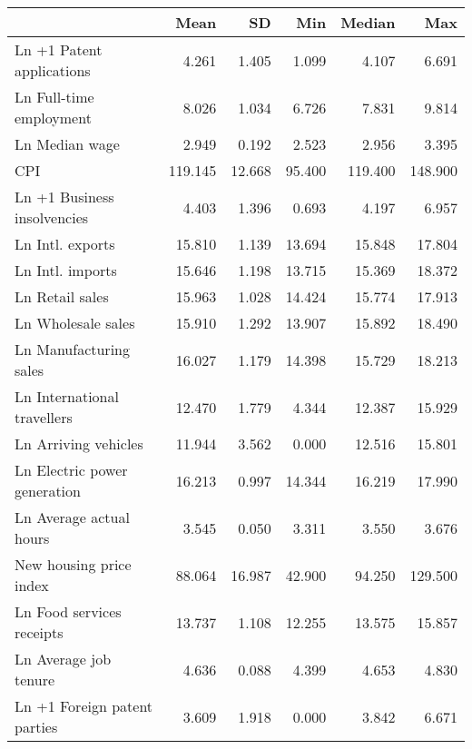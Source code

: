 
\begin{tabular}[t]{lrrrrr}
\toprule
  & Mean & SD & Min & Median & Max\\
\midrule
Ln +1 Patent applications & \num{4.261} & \num{1.405} & \num{1.099} & \num{4.107} & \num{6.691}\\
Ln Full-time employment & \num{8.026} & \num{1.034} & \num{6.726} & \num{7.831} & \num{9.814}\\
Ln Median wage & \num{2.949} & \num{0.192} & \num{2.523} & \num{2.956} & \num{3.395}\\
CPI & \num{119.145} & \num{12.668} & \num{95.400} & \num{119.400} & \num{148.900}\\
Ln +1 Business insolvencies & \num{4.403} & \num{1.396} & \num{0.693} & \num{4.197} & \num{6.957}\\
Ln Intl. exports & \num{15.810} & \num{1.139} & \num{13.694} & \num{15.848} & \num{17.804}\\
Ln Intl. imports & \num{15.646} & \num{1.198} & \num{13.715} & \num{15.369} & \num{18.372}\\
Ln Retail sales & \num{15.963} & \num{1.028} & \num{14.424} & \num{15.774} & \num{17.913}\\
Ln Wholesale sales & \num{15.910} & \num{1.292} & \num{13.907} & \num{15.892} & \num{18.490}\\
Ln Manufacturing sales & \num{16.027} & \num{1.179} & \num{14.398} & \num{15.729} & \num{18.213}\\
Ln International travellers & \num{12.470} & \num{1.779} & \num{4.344} & \num{12.387} & \num{15.929}\\
Ln Arriving vehicles & \num{11.944} & \num{3.562} & \num{0.000} & \num{12.516} & \num{15.801}\\
Ln Electric power generation & \num{16.213} & \num{0.997} & \num{14.344} & \num{16.219} & \num{17.990}\\
Ln Average actual hours & \num{3.545} & \num{0.050} & \num{3.311} & \num{3.550} & \num{3.676}\\
New housing price index & \num{88.064} & \num{16.987} & \num{42.900} & \num{94.250} & \num{129.500}\\
Ln Food services receipts & \num{13.737} & \num{1.108} & \num{12.255} & \num{13.575} & \num{15.857}\\
Ln Average job tenure & \num{4.636} & \num{0.088} & \num{4.399} & \num{4.653} & \num{4.830}\\
Ln +1 Foreign patent parties & \num{3.609} & \num{1.918} & \num{0.000} & \num{3.842} & \num{6.671}\\
\bottomrule
\end{tabular}
